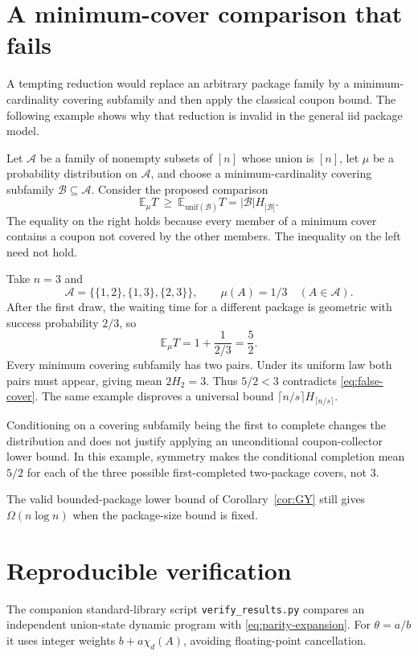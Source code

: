 \documentclass[11pt]{article}
\numberwithin{equation}{section}
\theoremstyle{remark}
\newcommand{\E}{\mathbb E}
\newcommand{\1}{\mathbf 1}
\begin{document}
\appendix
\section{A minimum-cover comparison that fails}\label{app:cover}

A tempting reduction would replace an arbitrary package family by a minimum-cardinality covering subfamily and then apply the classical coupon bound. The following example shows why that reduction is invalid in the general iid package model.

Let $\mathcal A$ be a family of nonempty subsets of $[n]$ whose union is $[n]$, let $\mu$ be a probability distribution on $\mathcal A$, and choose a minimum-cardinality covering subfamily $\mathcal B\subseteq\mathcal A$. Consider the proposed comparison
\begin{equation}\label{eq:false-cover}
 \E_\mu T\ \geq\ \E_{\mathrm{unif}(\mathcal B)}T
 =|\mathcal B|H_{|\mathcal B|}.
\end{equation}
The equality on the right holds because every member of a minimum cover contains a coupon not covered by the other members. The inequality on the left need not hold.

Take $n=3$ and
\[
 \mathcal A=\bigl\{\{1,2\},\{1,3\},\{2,3\}\bigr\},
 \qquad \mu(A)=1/3\quad(A\in\mathcal A).
\]
After the first draw, the waiting time for a different package is geometric with success probability $2/3$, so
\[
 \E_\mu T=1+\frac1{2/3}=\frac52.
\]
Every minimum covering subfamily has two pairs. Under its uniform law both pairs must appear, giving mean $2H_2=3$. Thus $5/2<3$ contradicts \eqref{eq:false-cover}. The same example disproves a universal bound $\lceil n/s\rceil H_{\lceil n/s\rceil}$.

Conditioning on a covering subfamily being the first to complete changes the distribution and does not justify applying an unconditional coupon-collector lower bound. In this example, symmetry makes the conditional completion mean $5/2$ for each of the three possible first-completed two-package covers, not $3$.

The valid bounded-package lower bound of Corollary~\ref{cor:GY} still gives $\Omega(n\log n)$ when the package-size bound is fixed.

\section{Reproducible verification}\label{app:verification}

The companion standard-library script \texttt{verify\_results.py} compares an independent union-state dynamic program with \eqref{eq:parity-expansion}. For $\theta=a/b$ it uses integer weights $b+a\chi_d(A)$, avoiding floating-point cancellation.
\end{document}

